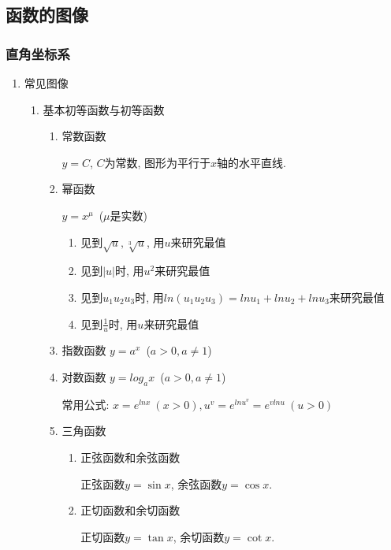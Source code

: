 \subsection{函数的图像}
\subsubsection{直角坐标系}
\begin{enumerate}
\item 常见图像
\begin{enumerate}
\item 基本初等函数与初等函数
\begin{enumerate}
\item 常数函数\par
$ y=C $, $ C $为常数, 图形为平行于$ x $轴的水平直线.
\item 幂函数\par
$ y=x^{\mu} $\ ($ \mu $是实数)
\begin{tcolorbox}
\begin{enumerate}
\item 见到$ \sqrt{u},\sqrt[3]{u} $, 用$ u $来研究最值
\item 见到$ |u| $时, 用$ u^{2} $来研究最值
\item 见到$ u_{1}u_{2}u_{3} $时, 用$ ln(u_{1}u_{2}u_{3})=lnu_{1}+lnu_{2}+lnu_{3} $来研究最值
\item 见到$ \frac{1}{u} $时, 用$ u $来研究最值
\end{enumerate}
\end{tcolorbox}
\item 指数函数
$ y=a^{x} $\ ($ a>0,a\neq 1 $)
\item 对数函数
$ y=log_{a}x $\ ($ a>0,a\neq 1 $)
\begin{tcolorbox}
常用公式: $ x=e^{lnx}\ (x>0), u^{v}=e^{lnu^{v}}=e^{vlnu}\ (u>0) $
\end{tcolorbox}
\item 三角函数
\begin{enumerate}
\item 正弦函数和余弦函数\par
正弦函数$ y=\sin x $, 余弦函数$ y=\cos x $.
\item 正切函数和余切函数\par
正切函数$ y=\tan x $, 余切函数$ y=\cot x $.\par
\begin{figure}[htp]
\centering
\begin{subfigure}{.475\linewidth}
\centering
\begin{tikzpicture}[
]

\end{tikzpicture}
\end{subfigure}
\end{figure}
\end{enumerate}
\end{enumerate}
\end{enumerate}
\end{enumerate}
